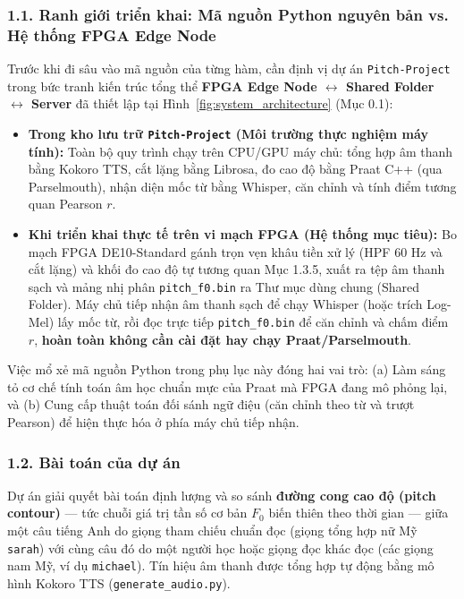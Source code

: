 \documentclass[11pt,a4paper]{article}
\begin{document}
\subsubsection*{1.1. Ranh giới triển khai: Mã nguồn Python nguyên bản vs. Hệ thống FPGA Edge Node}
Trước khi đi sâu vào mã nguồn của từng hàm, cần định vị dự án \texttt{Pitch-Project} trong bức tranh kiến trúc tổng thể \textbf{FPGA Edge Node $\leftrightarrow$ Shared Folder $\leftrightarrow$ Server} đã thiết lập tại Hình~\ref{fig:system_architecture} (Mục 0.1):
\begin{itemize}
    \setlength{\itemsep}{1pt}
    \item \textbf{Trong kho lưu trữ \texttt{Pitch-Project} (Môi trường thực nghiệm máy tính):} Toàn bộ quy trình chạy trên CPU/GPU máy chủ: tổng hợp âm thanh bằng Kokoro TTS, cắt lặng bằng Librosa, đo cao độ bằng Praat C++ (qua Parselmouth), nhận diện mốc từ bằng Whisper, căn chỉnh và tính điểm tương quan Pearson $r$.
    \item \textbf{Khi triển khai thực tế trên vi mạch FPGA (Hệ thống mục tiêu):} Bo mạch FPGA DE10-Standard gánh trọn vẹn khâu tiền xử lý (HPF 60 Hz và cắt lặng) và khối đo cao độ tự tương quan Mục 1.3.5, xuất ra tệp âm thanh sạch và mảng nhị phân \texttt{pitch\_f0.bin} ra Thư mục dùng chung (Shared Folder). Máy chủ tiếp nhận âm thanh sạch để chạy Whisper (hoặc trích Log-Mel) lấy mốc từ, rồi đọc trực tiếp \texttt{pitch\_f0.bin} để căn chỉnh và chấm điểm $r$, \textbf{hoàn toàn không cần cài đặt hay chạy Praat/Parselmouth}.
\end{itemize}
Việc mổ xẻ mã nguồn Python trong phụ lục này đóng hai vai trò: (a) Làm sáng tỏ cơ chế tính toán âm học chuẩn mực của Praat mà FPGA đang mô phỏng lại, và (b) Cung cấp thuật toán đối sánh ngữ điệu (căn chỉnh theo từ và trượt Pearson) để hiện thực hóa ở phía máy chủ tiếp nhận.

\subsubsection*{1.2. Bài toán của dự án}
Dự án giải quyết bài toán định lượng và so sánh \textbf{đường cong cao độ (pitch contour)} --- tức chuỗi giá trị tần số cơ bản $F_0$ biến thiên theo thời gian --- giữa một câu tiếng Anh do giọng tham chiếu chuẩn đọc (giọng tổng hợp nữ Mỹ \texttt{sarah}) với cùng câu đó do một người học hoặc giọng đọc khác đọc (các giọng nam Mỹ, ví dụ \texttt{michael}). Tín hiệu âm thanh được tổng hợp tự động bằng mô hình Kokoro TTS (\texttt{generate\_audio.py}). 
\end{document}
